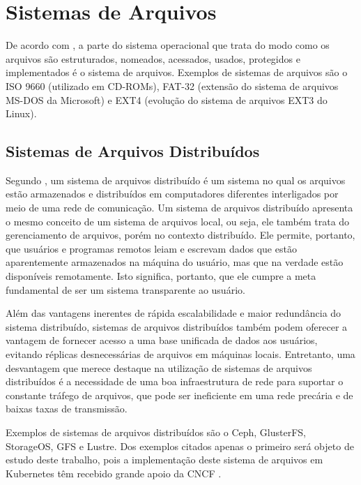 \section{Sistemas de Arquivos}

De acordo com , a parte do sistema operacional que trata do modo como os arquivos são estruturados, nomeados, acessados, usados, protegidos e implementados é o sistema de arquivos. Exemplos de sistemas de arquivos são o ISO 9660 (utilizado em CD-ROMs), FAT-32 (extensão do sistema de arquivos MS-DOS da Microsoft) e EXT4 (evolução do sistema de arquivos EXT3 do Linux). 

\subsection{Sistemas de Arquivos Distribuídos}

Segundo , um sistema de arquivos distribuído é um sistema no qual os arquivos estão armazenados e distribuídos em computadores diferentes interligados por meio de uma rede de comunicação. Um sistema de arquivos distribuído apresenta o mesmo conceito de um sistema de arquivos local, ou seja, ele também trata do gerenciamento de arquivos, porém no contexto distribuído. Ele permite, portanto, que usuários e programas remotos leiam e escrevam dados que estão aparentemente armazenados na máquina do usuário, mas que na verdade estão disponíveis remotamente. Isto significa, portanto, que ele cumpre a meta fundamental de ser um sistema transparente ao usuário.

Além das vantagens inerentes de rápida escalabilidade e maior redundância do sistema distribuído, sistemas de arquivos distribuídos também podem oferecer a vantagem de fornecer acesso a uma base unificada de dados aos usuários, evitando réplicas desnecessárias de arquivos em máquinas locais. Entretanto, uma desvantagem que merece destaque na utilização de sistemas de arquivos distribuídos é a necessidade de uma boa infraestrutura de rede para suportar o constante tráfego de arquivos, que pode ser ineficiente em uma rede precária e de baixas taxas de transmissão.

Exemplos de sistemas de arquivos distribuídos são o Ceph, GlusterFS, StorageOS, \ac{GFS} e Lustre. Dos exemplos citados apenas o primeiro será objeto de estudo deste trabalho, pois a implementação deste sistema de arquivos em Kubernetes têm recebido grande apoio da \ac{CNCF} \cite{rookincubator}.

